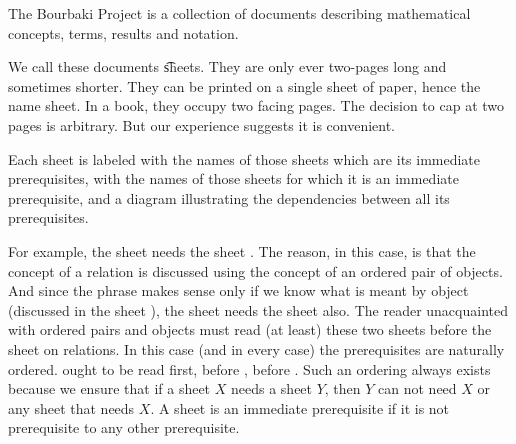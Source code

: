 
The Bourbaki Project is a collection of documents describing mathematical concepts, terms, results and notation.


We call these documents \t{sheets}.
They are only ever two-pages long and sometimes shorter.
They can be printed on a single sheet of paper, hence the name sheet.
In a book, they occupy two facing pages.
The decision to cap at two pages is arbitrary.
But our experience suggests it is convenient.



Each sheet is labeled with the names of those sheets which are its immediate prerequisites, with the names of those sheets for which it is an immediate prerequisite, and a diagram illustrating the dependencies between all its prerequisites.

For example, the sheet  needs the sheet .
The reason, in this case, is that the concept of a relation is discussed using the concept of an ordered pair of objects.
And since the phrase  makes sense only if we know what is meant by object (discussed in the sheet ), the sheet  needs the sheet  also.
The reader unacquainted with ordered pairs and objects must read (at least) these two sheets before the sheet on relations.
In this case (and in every case) the prerequisites are naturally ordered.
 ought to be read first, before , before .
Such an ordering always exists because we ensure that if a sheet $X$ needs a sheet $Y$, then $Y$ can not need $X$ or any sheet that needs $X$.
A sheet is an immediate prerequisite if it is not prerequisite to any other prerequisite.

